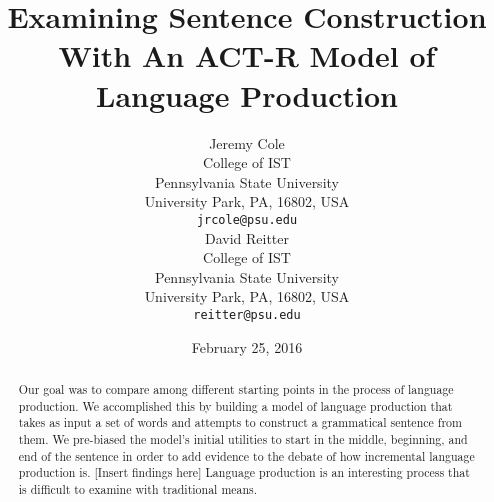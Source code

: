 \documentclass[11pt]{article}
\title{Examining Sentence Construction With An ACT-R Model of Language Production}
\author{Jeremy Cole \\
College of IST \\
Pennsylvania State University \\
University Park, PA, 16802, USA \\
  {\tt jrcole@psu.edu} \\ \And
David Reitter \\
College of IST \\
Pennsylvania State University \\
University Park, PA, 16802, USA \\
  {\tt reitter@psu.edu} \\
}
\date{February 25, 2016}
\begin{document}
\maketitle
\begin{abstract}
Our goal was to compare among different starting points in the process of language production. We accomplished this by building a model of language production that takes as input a set of words and attempts to construct a grammatical sentence from them. We pre-biased the model's initial utilities to start in the middle, beginning, and end of the sentence in order to add evidence to the debate of how incremental language production is. [Insert findings here]  Language production is an interesting process that is difficult to examine with traditional means. 

\end{abstract}






%
%
%
%




%
%
%
%



\end{document}
